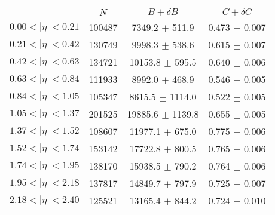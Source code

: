 \begin{tabular}{lccc}
\hline
    &   $N$   & $B \pm \delta B$  &  $C \pm \delta C$ \\
\hline
$0.00 < |\eta| <0.21$          & 100487     & 7349.2     $\pm$ 511.9 & 0.473      $\pm$ 0.007 \\
$0.21 < |\eta| <0.42$          & 130749     & 9998.3     $\pm$ 538.6 & 0.615      $\pm$ 0.007 \\
$0.42 < |\eta| <0.63$          & 134721     & 10153.8    $\pm$ 595.5 & 0.640      $\pm$ 0.006 \\
$0.63 < |\eta| <0.84$          & 111933     & 8992.0     $\pm$ 468.9 & 0.546      $\pm$ 0.005 \\
$0.84 < |\eta| <1.05$          & 105347     & 8615.5     $\pm$ 1114.0 & 0.522      $\pm$ 0.005 \\
$1.05 < |\eta| <1.37$          & 201525     & 19885.6    $\pm$ 1139.8 & 0.655      $\pm$ 0.005 \\
$1.37 < |\eta| <1.52$          & 108607     & 11977.1    $\pm$ 675.0 & 0.775      $\pm$ 0.006 \\
$1.52 < |\eta| <1.74$          & 153142     & 17722.8    $\pm$ 800.5 & 0.765      $\pm$ 0.006 \\
$1.74 < |\eta| <1.95$          & 138170     & 15938.5    $\pm$ 790.2 & 0.764      $\pm$ 0.006 \\
$1.95 < |\eta| <2.18$          & 137817     & 14849.7    $\pm$ 797.9 & 0.725      $\pm$ 0.007 \\
$2.18 < |\eta| <2.40$          & 125521     & 13165.4    $\pm$ 844.2 & 0.724      $\pm$ 0.010 \\
\hline
\end{tabular}
